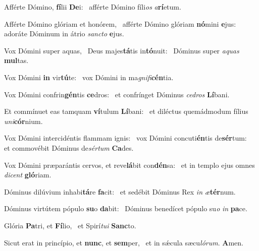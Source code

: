 \item Afférte Dómino, \textbf{fí}lii \textbf{De}i:~\psstar{} afférte Dómino fíli\textit{os} \textit{a}\textbf{rí}etum.
\item Afférte Dómino glóriam et honórem,~\pscross{} afférte Dómino glóriam \textbf{nó}mini \textbf{e}jus:~\psstar{} adoráte Dóminum in átrio \textit{sancto} \textbf{e}jus.
\item Vox Dómini super aquas,~\pscross{} Deus majes\textbf{tá}tis in\textbf{tó}nuit:~\psstar{} Dóminus super \textit{aquas} \textbf{mul}tas.
\item Vox Dómini \textbf{in} vir\textbf{tú}te:~\psstar{} vox Dómini in ma\textit{gnifi}\textbf{cén}tia.
\item Vox Dómini confrin\textbf{gén}tis \textbf{ce}dros:~\psstar{} et confrínget Dóminus \textit{cedros} \textbf{Lí}bani.
\item Et commínuet eas tamquam \textbf{ví}tulum \textbf{Lí}bani:~\psstar{} et diléctus quemádmodum fílius \textit{uni}\textbf{cór}nium.
\item Vox Dómini intercidéntis flammam ignis:~\pscross{} vox Dómini concuti\textbf{én}tis de\textbf{sér}tum:~\psstar{} et commovébit Dóminus de\textit{sértum} \textbf{Ca}des.
\item Vox Dómini præparántis cervos, et reve\textbf{lá}bit con\textbf{dén}sa:~\psstar{} et in templo ejus omnes \textit{dicent} \textbf{gló}riam.
\item Dóminus dilúvium inhabi\textbf{tá}re \textbf{fa}cit:~\psstar{} et sedébit Dóminus Rex \textit{in} \textit{æ}\textbf{tér}num.
\item Dóminus virtútem pópulo \textbf{su}o \textbf{da}bit:~\psstar{} Dóminus benedícet pópulo su\textit{o} \textit{in} \textbf{pa}ce.
\item Glória \textbf{Pa}tri, et \textbf{Fí}lio,~\psstar{} et Spirí\textit{tui} \textbf{Sanc}to.
\item Sicut erat in princípio, et \textbf{nunc}, et \textbf{sem}per,~\psstar{} et in sǽcula sæcu\textit{lórum}. \textbf{A}men.